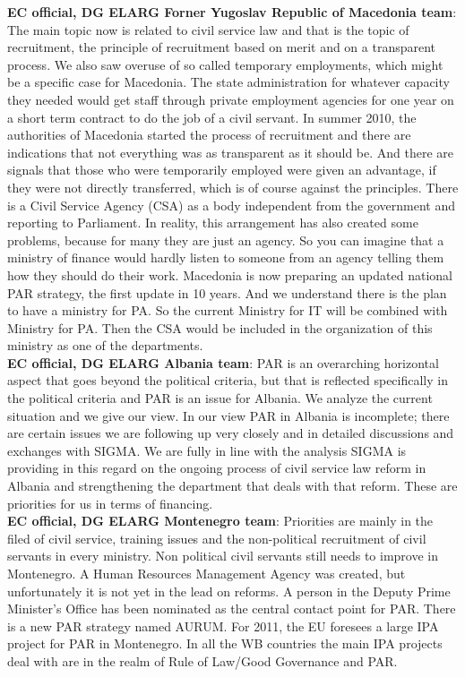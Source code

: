 \textbf{EC official, DG ELARG Forner Yugoslav Republic of Macedonia team}: The main topic now is related to civil service law and that is the topic of recruitment, the principle of recruitment based on merit and on a transparent process. We also saw overuse of so called temporary employments, which might be a specific case for Macedonia. The state administration for whatever capacity they needed would get staff through private employment agencies for one year on a short term contract to do the job of a civil servant. In summer 2010, the authorities of Macedonia started the process of recruitment and there are indications that not everything was as transparent as it should be. And there are signals that those who were temporarily employed were given an advantage, if they were not directly transferred, which is of course against the principles. There is a Civil Service Agency (CSA) as a body independent from the government and reporting to Parliament. In reality, this arrangement has also created some problems, because for many they are just an agency. So you can imagine that a ministry of finance would hardly listen to someone from an agency telling them how they should do their work. Macedonia is now preparing an updated national PAR strategy, the first update in 10 years. And we understand there is the plan to have a ministry for PA. So the current Ministry for IT will be combined with Ministry for PA. Then the CSA would be included in the organization of this ministry as one of the departments. \\
\textbf{EC official, DG ELARG Albania team}: PAR is an overarching horizontal aspect that goes beyond the political criteria, but that is reflected specifically in the political criteria and PAR is an issue for Albania. We analyze the current situation and we give our view. In our view PAR in Albania is incomplete; there are certain issues we are following up very closely and in detailed discussions and exchanges with SIGMA. We are fully in line with the analysis SIGMA is providing in this regard on the ongoing process of civil service law reform in Albania and strengthening the department that deals with that reform. These are priorities for us in terms of financing.\\
\textbf{EC official, DG ELARG Montenegro team}: Priorities are mainly in the filed of civil service, training issues and the non-political recruitment of civil servants in every ministry. Non political civil servants still needs to improve in Montenegro. A Human Resources Management Agency was created, but unfortunately it is not yet in the lead on reforms. A person in the Deputy Prime Minister's Office has been nominated as the central contact point for PAR. There is a new PAR strategy named AURUM. For 2011, the EU foresees a large IPA project for PAR in Montenegro. In all the WB countries the main IPA projects deal with are in the realm of Rule of Law/Good Governance and PAR. \\
